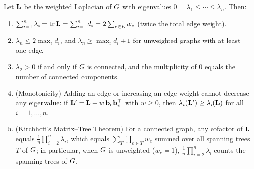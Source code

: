 \begin{proposition}\label{ch31:prop-toolbox}
Let $\mathbf{L}$ be the weighted Laplacian of $G$ with eigenvalues $0=\lambda_1\le\cdots\le\lambda_n$. Then:
\begin{enumerate}
  \item $\sum_{i=1}^n \lambda_i = \operatorname{tr}\mathbf{L} = \sum_{i=1}^n d_i = 2\sum_{e\in E} w_e$ (twice the total edge weight).
  \item $\lambda_n \le 2\max_i d_i$, and $\lambda_n \ge \max_i d_i + 1$ for unweighted graphs with at least one edge.
  \item $\lambda_2 > 0$ if and only if $G$ is connected, and the multiplicity of $0$ equals the number of connected components.
  \item (Monotonicity) Adding an edge or increasing an edge weight cannot decrease any eigenvalue: if $\mathbf{L}' = \mathbf{L} + w\,\mathbf{b}_e\mathbf{b}_e^\top$ with $w\ge0$, then $\lambda_i(\mathbf{L}') \ge \lambda_i(\mathbf{L})$ for all $i=1,\dots,n$.
  \item (Kirchhoff's Matrix--Tree Theorem) For a connected graph, any cofactor of $\mathbf{L}$ equals $\tfrac1n \prod_{i=2}^{n}\lambda_i$, which equals $\sum_{T} \prod_{e\in T} w_e$ summed over all spanning trees $T$ of $G$; in particular, when $G$ is unweighted ($w_e = 1$), $\tfrac1n \prod_{i=2}^{n}\lambda_i$ counts the spanning trees of $G$.
\end{enumerate}
\end{proposition}

